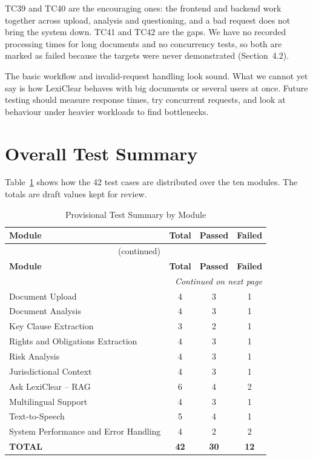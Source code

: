 \documentclass[12pt,a4paper,oneside]{report}
\begin{document}
TC39 and TC40 are the encouraging ones: the frontend and backend work together across upload, analysis and questioning, and a bad request does not bring the system down. TC41 and TC42 are the gaps. We have no recorded processing times for long documents and no concurrency tests, so both are marked as failed because the targets were never demonstrated (Section~4.2).

The basic workflow and invalid-request handling look sound. What we cannot yet say is how LexiClear behaves with big documents or several users at once. Future testing should measure response times, try concurrent requests, and look at behaviour under heavier workloads to find bottlenecks.

\section{Overall Test Summary}
Table~\ref{tab:test-summary} shows how the 42 test cases are distributed over the ten modules. The totals are draft values kept for review.

{\footnotesize
\setlength{\tabcolsep}{6pt}
\renewcommand{\arraystretch}{1.2}
\begin{longtable}{|l|c|c|c|}
\caption{Provisional Test Summary by Module}\label{tab:test-summary}\\
\hline
\textbf{Module} & \textbf{Total} & \textbf{Passed} & \textbf{Failed}\\
\hline
\endfirsthead
\multicolumn{4}{c}{\tablename~\thetable{} (continued)}\\
\hline
\textbf{Module} & \textbf{Total} & \textbf{Passed} & \textbf{Failed}\\
\hline
\endhead
\hline
\multicolumn{4}{r}{\emph{Continued on next page}}\\
\endfoot
\hline
\endlastfoot
Document Upload & 4 & 3 & 1\\
\hline
Document Analysis & 4 & 3 & 1\\
\hline
Key Clause Extraction & 3 & 2 & 1\\
\hline
Rights and Obligations Extraction & 4 & 3 & 1\\
\hline
Risk Analysis & 4 & 3 & 1\\
\hline
Jurisdictional Context & 4 & 3 & 1\\
\hline
Ask LexiClear -- RAG & 6 & 4 & 2\\
\hline
Multilingual Support & 4 & 3 & 1\\
\hline
Text-to-Speech & 5 & 4 & 1\\
\hline
System Performance and Error Handling & 4 & 2 & 2\\
\hline
\textbf{TOTAL} & \textbf{42} & \textbf{30} & \textbf{12}\\
\end{longtable}
}
\end{document}

